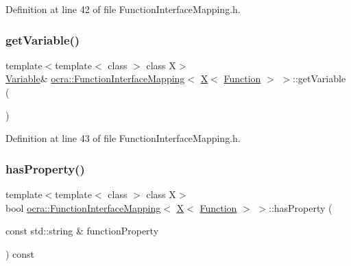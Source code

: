 Definition at line 42 of file Function\+Interface\+Mapping.\+h.

\hypertarget{structocra_1_1FunctionInterfaceMapping_3_01X_3_01Function_01_4_01_4_a799447e899dab515b46d322223e8b2cf}{}\label{structocra_1_1FunctionInterfaceMapping_3_01X_3_01Function_01_4_01_4_a799447e899dab515b46d322223e8b2cf} 
\subsubsection{\texorpdfstring{get\+Variable()}{getVariable()}\hspace{0.1cm}{\footnotesize\ttfamily [2/2]}}
{\footnotesize\ttfamily template$<$template$<$ class $>$ class X$>$ \\
\hyperlink{classocra_1_1Variable}{Variable}\& \hyperlink{structocra_1_1FunctionInterfaceMapping}{ocra\+::\+Function\+Interface\+Mapping}$<$ \hyperlink{namespaceocra_a436781c7059a0f76027df1c652126260a53f3cfeeb322946db40cd86dfebfb237}{X}$<$ \hyperlink{classocra_1_1Function}{Function} $>$ $>$\+::get\+Variable (\begin{DoxyParamCaption}{ }\end{DoxyParamCaption})\hspace{0.3cm}{\ttfamily [inline]}}



Definition at line 43 of file Function\+Interface\+Mapping.\+h.

\hypertarget{structocra_1_1FunctionInterfaceMapping_3_01X_3_01Function_01_4_01_4_a8fbc174cf47fff622585a56db6444286}{}\label{structocra_1_1FunctionInterfaceMapping_3_01X_3_01Function_01_4_01_4_a8fbc174cf47fff622585a56db6444286} 
\subsubsection{\texorpdfstring{has\+Property()}{hasProperty()}}
{\footnotesize\ttfamily template$<$template$<$ class $>$ class X$>$ \\
bool \hyperlink{structocra_1_1FunctionInterfaceMapping}{ocra\+::\+Function\+Interface\+Mapping}$<$ \hyperlink{namespaceocra_a436781c7059a0f76027df1c652126260a53f3cfeeb322946db40cd86dfebfb237}{X}$<$ \hyperlink{classocra_1_1Function}{Function} $>$ $>$\+::has\+Property (\begin{DoxyParamCaption}\item[{const std\+::string \&}]{function\+Property }\end{DoxyParamCaption}) const\hspace{0.3cm}{\ttfamily [inline]}}



